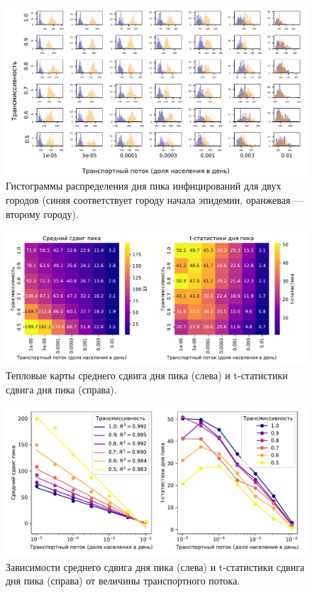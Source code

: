 \documentclass[a4paper,12pt]{article} %
\begin{document}
\begin{figure}[H]
    \centering
    \includegraphics[width=0.95\linewidth]{images/flows_hists_day.pdf}
    \caption{Гистограммы распределения дня пика инфицирований для двух городов (синяя соответствует городу начала эпидемии, оранжевая --- второму городу).}
    \label{pic:flows_hists_day}
\end{figure}

\begin{figure}[H]
    \centering
    \includegraphics[width=0.95\linewidth]{images/flows_heatmap_conference.pdf}
    \caption{Тепловые карты среднего сдвига дня пика (слева) и t-статистики сдвига дня пика (справа).}
    \label{pic:flows_heatmap_conference}
\end{figure}

\begin{figure}[H]
    \centering
    \includegraphics[width=0.95\linewidth]{images/flows_lines.pdf}
    \caption{Зависимости среднего сдвига дня пика (слева) и t-статистики сдвига дня пика (справа) от величины транспортного потока.}
    \label{pic:flows_lines}
\end{figure}
\end{document}
